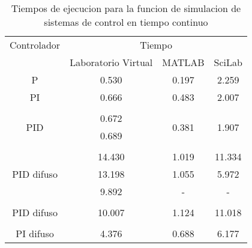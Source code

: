         {\setlength\LTleft{0pt}
        \setlength\LTright{0pt}
        \centering
        \renewcommand{\arraystretch}{0.80}
        \begin{longtable}{c @{\extracolsep{\fill}} ccc}
        \caption[Tiempos de ejecucion para la funcion de simulacion de sistemas de control en tiempo continuo]{Tiempos de ejecucion para la funcion de simulacion de sistemas de control en tiempo continuo} 
        \label{tab:timeC} \\
        \toprule
        Controlador   &        \multicolumn{3}{c}{Tiempo}        \\ \cmidrule{1-1} \cmidrule{2-4}
                      &   Laboratorio Virtual  & MATLAB & SciLab  \\ \cmidrule{2-2} \cmidrule{3-3} \cmidrule{4-4}
        \endhead
        \bottomrule
        \endfoot
        P                            & 0.530  &         0.197          &        2.259           \\
        PI                           & 0.666  &         0.483          &        2.007           \\
                                     &        &                        &                        \\[-3pt]
        \multirow{2}{*}{PID}         & 0.672  & \multirow{2}{*}{0.381} & \multirow{2}{*}{1.907} \\
                                     & 0.689  &                        &                        \\
                                     &        &                        &                        \\[-3pt]
        \multirow{3}{*}{PID difuso}  & 14.430 &         1.019          &        11.334          \\
                                     & 13.198 &         1.055          &        5.972           \\
                                     & 9.892  &           -            &          -             \\
                                     &        &                        &                        \\[-3pt]
        PID difuso                   & 10.007 &         1.124          &        11.018          \\
                                     &        &                        &                        \\[-3pt]
        \multirow{2}{*}{PI difuso}   & 4.376  & \multirow{2}{*}{0.688} & \multirow{2}{*}{6.177} \\

\end{longtable}}
